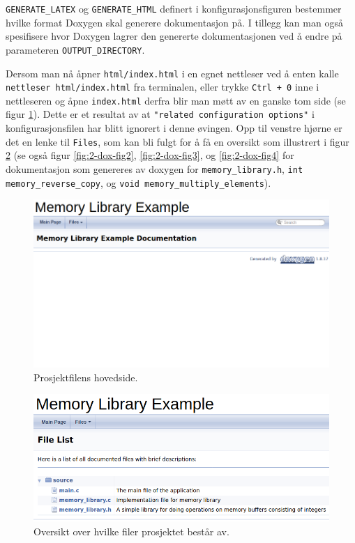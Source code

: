 \begin{alphasection}
\verb|GENERATE_LATEX| og \verb|GENERATE_HTML| definert i konfigurasjonsfiguren bestemmer hvilke format Doxygen skal generere dokumentasjon på. I tillegg kan man også spesifisere hvor Doxygen lagrer den genererte dokumentasjonen ved å endre på parameteren \verb|OUTPUT_DIRECTORY|.

Dersom man nå åpner \verb|html/index.html| i en egnet nettleser ved å enten kalle \verb|nettleser html/index.html| fra terminalen, eller trykke \verb|Ctrl + 0| inne i nettleseren og åpne \verb|index.html| derfra blir man møtt av en ganske tom side (se figur \ref{fig:2-dox-fig-main}). Dette er et resultat av at \verb|"related configuration options"| i konfigurasjonsfilen har blitt ignorert i denne øvingen. Opp til venstre hjørne er det en lenke til \verb|Files|, som kan bli fulgt for å få en oversikt som illustrert i figur \ref{fig:2-dox-fig} (se også figur \ref{fig:2-dox-fig2}, \ref{fig:2-dox-fig3}, og  \ref{fig:2-dox-fig4} for dokumentasjon som genereres av doxygen for \verb|memory_library.h|, \verb|int memory_reverse|\verb|_copy|, og \verb|void memory_multiply_elements|).


\begin{figure}[ht]
    \centering
    \includegraphics[width=135mm]{figures/doxygen-main.png}
    \caption{Prosjektfilens hovedside.}
    \label{fig:2-dox-fig-main}
\end{figure}

\begin{figure}[ht]
    \centering
    \includegraphics[width=131mm]{figures/doxygenfil1.png}
    \caption{Oversikt over hvilke filer prosjektet består av.}
    \label{fig:2-dox-fig}
\end{figure}



\end{alphasection}
